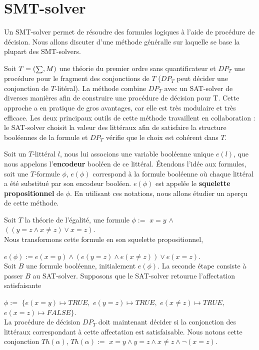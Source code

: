 \documentclass[9pt,openany]{book}
\newcommand\smallsum{\mathsmaller\sum}
\begin{document}
 	\section{SMT-solver}
	 		Un SMT-solver permet de r\'esoudre des formules logiques \`a l'aide de proc\'edure de d\'ecision. Nous allons discuter d'une m\'ethode g\'en\'eralle sur laquelle se base la plupart des SMT-solvers.\\ \par Soit $T=(\smallsum,M)$ une th\'eorie du premier ordre sans quantificateur et $DP_{T}$ une proc\'edure pour le fragment des conjonctions de $T$ ($DP_{T}$ peut d\'ecider une conjonction de $T$-lit\'eral). La m\'ethode combine $DP_{T}$ avec un SAT-solver  de diverses mani\`eres afin de construire une proc\'edure de d\'ecision pour T. Cette approche a en pratique de gros avantages, car elle est tr\`es modulaire et tr\`es efficace. Les deux principaux outils de cette m\'ethode travaillent en collaboration : le SAT-solver choisit la valeur des litt\'eraux afin de satisfaire la structure bool\'eennes de la formule et $DP_{T}$ v\'erifie que le choix est coh\'erent dans $T$.\par
	 		Soit un $T$-litt\'eral $l$, nous lui associons une variable bool\'eenne unique $e(l)$, que nous appelons l'\textbf{encodeur} bool\'een de ce litt\'eral. \'Etendons l'id\'ee aux formules, soit une $T$-formule $\phi$, $e(\phi)$ correspond \`a la formule bool\'eenne o\`u chaque litt\'eral a \'et\'e substitu\'e par son encodeur bool\'een. $e(\phi)$ est appel\'ee le \textbf{squelette propositionnel} de $\phi$. En utilisant ces notations, nous allons \'etudier un aper\c{c}u de cette m\'ethode.\par 
	 		Soit $T$ la th\'eorie de l'\'egalit\'e, une formule	$\phi :=$ $x=y$ $\land$ $((y=z\land x\neq z)\lor x=z)$.\\
	 		Nous transformons cette formule en son squelette propositionnel,\par $e(\phi):= e(x=y)\land (e(y=z)\land e(x\neq z))\lor e(x=z)$.\\
Soit $B$ une formule bool\'eenne, initialement $e(\phi)$. La seconde \'etape consiste \`a passer $B$ au SAT-solver. Supposons que le SAT-solver retourne l'affectation satisfaisante\par
$\phi:=$ $\{e(x=y)\mapsto TRUE, $ $e(y=z)\mapsto TRUE,$ $e(x\neq z)\mapsto TRUE,$ $e(x=z)\mapsto FALSE\}$.\\
La proc\'edure de d\'ecision $DP_{T}$ doit maintenant d\'ecider si la conjonction des litt\'eraux correspondant \`a cette affectation est satisfaisable. Nous notons cette conjonction $Th(\alpha)$, $Th(\alpha):=$ $x=y\land y=z\land x\neq z\land \neg(x=z)$.\par
\end{document}
